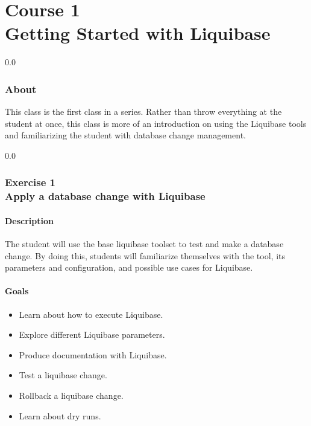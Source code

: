 \part*{Course 1\\
Getting Started with Liquibase
}

{\setlength{\baselineskip}%
  {0.0\baselineskip}
  \section*{\flushright About}
  \hrulefill \par}
This class is the first class in a series. Rather than throw
everything at the student at once, this class is more of an
introduction on using the Liquibase tools and familiarizing the
student with database change management.

{}
{\setlength{\baselineskip}%
  {0.0\baselineskip}
  \section*{\flushright Exercise 1\\
  Apply a database change with Liquibase}
  \hrulefill \par}

\subsection*{Description}
The student will use the base liquibase toolset to test and make a database
change. By doing this, students will familiarize themselves with the
tool, its parameters and configuration, and possible use cases for Liquibase.


\subsection*{Goals}
\begin{itemize}
  \item Learn about how to execute Liquibase.
  \item Explore different Liquibase parameters.
  \item Produce documentation with Liquibase.
  \item Test a liquibase change.
  \item Rollback a liquibase change.
  \item Learn about dry runs.
\end{itemize}

